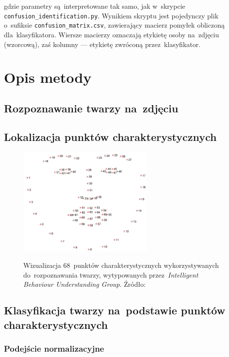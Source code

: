 \documentclass[11pt,a4paper]{article}
\begin{document}
gdzie parametry są~interpretowane tak samo, jak w~skrypcie \verb+confusion_identification.py+.
Wynikiem skryptu jest pojedynczy plik o~sufiksie \verb+confusion_matrix.csv+, zawierający macierz pomyłek obliczoną dla~klasyfikatora.
Wiersze macierzy oznaczają etykietę osoby na~zdjęciu (wzorcową), zaś kolumny --- etykietę zwróconą przez~klasyfikator.

\section{Opis metody}

\subsection{Rozpoznawanie twarzy na~zdjęciu}

\subsection{Lokalizacja punktów charakterystycznych}

\begin{figure}[H]
    \centering
    \includegraphics[width=0.6\textwidth]{res/img/figure_68_markup.jpg}
    \label{fig:68-landmarks}
    \caption{Wizualizacja 68~punktów charakterystycznych wykorzystywanych do~rozpoznawania twarzy, wytypowanych przez~\emph{Intelligent Behaviour Understanding Group}. Źródło: \cite{sagonas2013}}
\end{figure}

\subsection{Klasyfikacja twarzy na~podstawie punktów charakterystycznych}
\label{subsec:classification}

\subsubsection{Podejście normalizacyjne}
\end{document}
